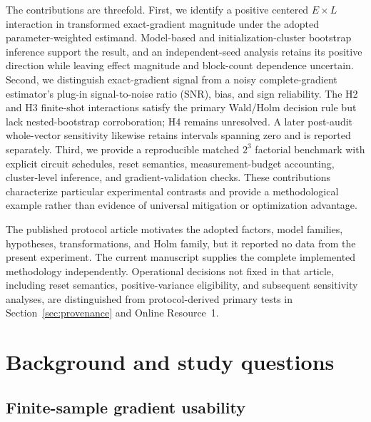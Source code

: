 \documentclass[pdflatex,sn-mathphys-num,Numbered]{sn-jnl}
\begin{document}
The contributions are threefold. First, we identify a positive centered $E\times L$ interaction in transformed exact-gradient magnitude under the adopted parameter-weighted estimand. Model-based and initialization-cluster bootstrap inference support the result, and an independent-seed analysis retains its positive direction while leaving effect magnitude and block-count dependence uncertain. Second, we distinguish exact-gradient signal from a noisy complete-gradient estimator's plug-in signal-to-noise ratio (SNR), bias, and sign reliability. The H2 and H3 finite-shot interactions satisfy the primary Wald/Holm decision rule but lack nested-bootstrap corroboration; H4 remains unresolved. A later post-audit whole-vector sensitivity likewise retains intervals spanning zero and is reported separately. Third, we provide a reproducible matched $2^3$ factorial benchmark with explicit circuit schedules, reset semantics, measurement-budget accounting, cluster-level inference, and gradient-validation checks. These contributions characterize particular experimental contrasts and provide a methodological example rather than evidence of universal mitigation or optimization advantage.

The published protocol article \cite{shen2026gradient} motivates the adopted factors, model families, hypotheses, transformations, and Holm family, but it reported no data from the present experiment. The current manuscript supplies the complete implemented methodology independently. Operational decisions not fixed in that article, including reset semantics, positive-variance eligibility, and subsequent sensitivity analyses, are distinguished from protocol-derived primary tests in Section~\ref{sec:provenance} and Online Resource~1.

\section{Background and study questions}

\subsection{Finite-sample gradient usability}
\end{document}
